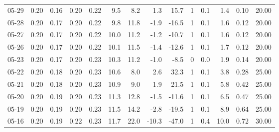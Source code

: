 \begin{threeparttable}
{\begin{tabular}{lrrrrrrrrrrrrr}
  05-29 &          0.20 &          0.16 &          0.20 &        0.22 &                 9.5 &                 8.2 &        1.3 &         15.7 &              1 &                 0.1 &              1.4 &            0.10 &                  20.00 \\
  05-28 &          0.20 &          0.17 &          0.20 &        0.22 &                 9.8 &                11.8 &       -1.9 &        -16.5 &              1 &                 0.1 &              1.6 &            0.12 &                  20.00 \\
  05-27 &          0.20 &          0.17 &          0.20 &        0.22 &                10.0 &                11.2 &       -1.2 &        -10.7 &              1 &                 0.1 &              1.6 &            0.12 &                  20.00 \\
  05-26 &          0.20 &          0.17 &          0.20 &        0.22 &                10.1 &                11.5 &       -1.4 &        -12.6 &              1 &                 0.1 &              1.7 &            0.12 &                  20.00 \\
  05-23 &          0.20 &          0.17 &          0.20 &        0.23 &                10.3 &                11.2 &       -1.0 &         -8.5 &              0 &                 0.0 &              1.9 &            0.14 &                  20.00 \\
  05-22 &          0.20 &          0.18 &          0.20 &        0.23 &                10.6 &                 8.0 &        2.6 &         32.3 &              1 &                 0.1 &              3.8 &            0.28 &                  25.00 \\
  05-21 &          0.20 &          0.18 &          0.20 &        0.23 &                10.9 &                 9.0 &        1.9 &         21.5 &              1 &                 0.1 &              5.8 &            0.42 &                  25.00 \\
  05-20 &          0.20 &          0.19 &          0.20 &        0.23 &                11.3 &                12.8 &       -1.5 &        -11.6 &              1 &                 0.1 &              6.5 &            0.47 &                  25.00 \\
  05-19 &          0.20 &          0.19 &          0.20 &        0.23 &                11.5 &                14.2 &       -2.8 &        -19.5 &              1 &                 0.1 &              8.9 &            0.64 &                  25.00 \\
  05-16 &          0.20 &          0.19 &          0.22 &        0.23 &                11.7 &                22.0 &      -10.3 &        -47.0 &              1 &                 0.4 &             10.0 &            0.72 &                  30.00 \\

\end{tabular}}
\end{threeparttable}
